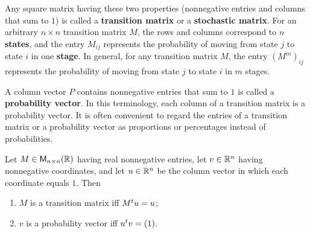 \begin{defn}\label{5.3.4}
  Any square matrix having these two properties (nonnegative entries and columns that sum to \(1\)) is called a \textbf{transition matrix} or a \textbf{stochastic matrix}.
  For an arbitrary \(n \times n\) transition matrix \(M\), the rows and columns correspond to \(n\) \textbf{states}, and the entry \(M_{i j}\) represents the probability of moving from state \(j\) to state \(i\) in one \textbf{stage}.
  In general, for any transition matrix \(M\), the entry \((M^m)_{i j}\) represents the probability of moving from state \(j\) to state \(i\) in \(m\) stages.

  A column vector \(P\) contains nonnegative entries that sum to \(1\) is called a \textbf{probability vector}.
  In this terminology, each column of a transition matrix is a probability vector.
  It is often convenient to regard the entries of a transition matrix or a probability vector as proportions or percentages instead of probabilities.
\end{defn}

\begin{thm}\label{5.15}
  Let \(M \in \mathsf{M}_{{n} \times n}({\mathbb{R}})\) having real nonnegative entries, let \(v \in \mathbb{R}^n\) having nonnegative coordinates, and let \(u \in \mathbb{R}^n\) be the column vector in which each coordinate equals \(1\).
  Then
  \begin{enumerate}
    \item \(M\) is a transition matrix iff \({M}^{t} u = u\);
    \item \(v\) is a probability vector iff \({u}^{t} v = (1)\).
  \end{enumerate}
\end{thm}

